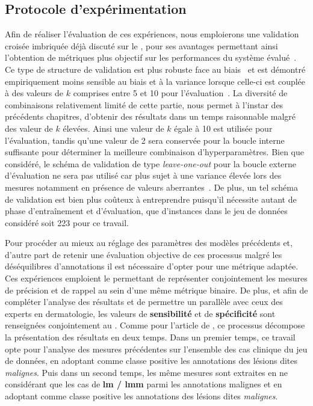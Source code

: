 \subsection{Protocole d'expérimentation}
Afin de réaliser l'évaluation de ces expériences, nous emploierons une validation croisée imbriquée déjà discuté sur le , pour ses avantages permettant ainsi l'obtention de métriques plus objectif sur les performances du système évalué~\cite{Cawley2010}. Ce type de structure de validation est plus robuste face au biais~\cite{Cawley2010} et est démontré empiriquement moins sensible au biais et à la variance lorsque celle-ci est couplée à des valeurs de $k$ comprises entre 5 et 10 pour l'évaluation~\cite{James2000}. La diversité de combinaisons relativement limité de cette partie, nous permet à l'instar des précédents chapitres, d'obtenir des résultats dans un temps raisonnable malgré des valeur de $k$ élevées. Ainsi une valeur de $k$ égale à 10 est utilisée pour l'évaluation, tandis qu'une valeur de 2 sera conservée pour la boucle interne suffisante pour déterminer la meilleure combinaison d'hyperparamètres. Bien que considéré, le schéma de validation de type \textit{leave-one-out} pour la boucle externe d'évaluation ne sera pas utilisé car plus sujet à une variance élevée lors des mesures notamment en présence de valeurs aberrantes~\cite{Bengio2004}. De plus, un tel schéma de validation est bien plus coûteux à entreprendre puisqu'il nécessite autant de phase d'entraînement et d'évaluation, que d'instances dans le jeu de données considéré soit 223 pour ce travail.\par

Pour procéder au mieux au réglage des paramètres des modèles précédents et, d'autre part de retenir une évaluation objective de ces processus malgré les déséquilibres d'annotations il est nécessaire d'opter pour une métrique adaptée. Ces expériences emploient le \textbf{\fscore{}} permettant de représenter conjointement les mesures de précision et de rappel au sein d'une même métrique binaire. De plus, et afin de compléter l'analyse des résultats et de permettre un parallèle avec ceux des experts en dermatologie, les valeurs de \textbf{sensibilité} et de \textbf{spécificité} sont renseignées conjointement au \fscore{}. Comme pour l'article de \cite{Cinotti2016}, ce processus décompose la présentation des résultats en deux temps. Dans un premier temps, ce travail opte pour l'analyse des mesures précédentes sur l'ensemble des cas clinique du jeu de données, en adoptant comme classe positive les annotations des lésions dites \textit{malignes}. Puis dans un second temps, les même mesures sont extraites en ne considérant que les cas de \textbf{\gls{lm} / \gls{lmm}} parmi les annotations malignes et en adoptant comme classe positive les annotations des lésions dites \textit{malignes}.\par

